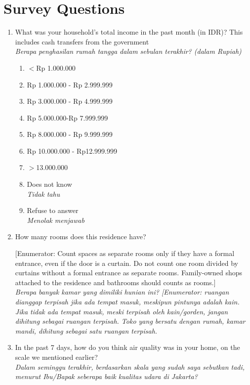 \documentclass[reqno,12pt,notitlepage]{article}
\begin{document}
\clearpage
\newpage
\section{Survey Questions}
\begin{enumerate}
\item What was your household's total income in the past month (in IDR)? This includes cash transfers from the government \\ \textit{ Berapa penghasilan rumah tangga dalam sebulan terakhir? (dalam Rupiah)}
\begin{enumerate}
    \item $<$Rp 1.000.000
    \item Rp 1.000.000 - Rp 2.999.999
    \item Rp 3.000.000 - Rp 4.999.999
    \item Rp 5.000.000-Rp 7.999.999
    \item Rp 8.000.000 - Rp 9.999.999
    \item Rp 10.000.000 - Rp12.999.999
    \item $>$13.000.000
        \item Does not know \\ \textit{Tidak tahu}
        \item Refuse to answer \\ \textit{Menolak menjawab}
\end{enumerate}
\item How many rooms does this residence have?

[Enumerator: Count spaces as separate rooms only if they have a formal entrance, even if the door is a curtain. Do not count one room divided by curtains without a formal entrance as separate rooms. Family-owned shops attached to the residence and bathrooms should counts as rooms.] \\ \textit{Berapa banyak kamar yang dimiliki hunian ini? 
[Enumerator: ruangan dianggap terpisah jika ada tempat masuk, meskipun pintunya adalah kain. Jika tidak ada tempat masuk, meski terpisah oleh kain/gorden, jangan dihitung sebagai ruangan terpisah. Toko yang bersatu dengan rumah, kamar mandi, dihitung sebagai satu ruangan terpisah.}

    \item In the past 7 days, how do you think air quality was in your home, on the scale we mentioned earlier? \\ \textit{Dalam seminggu terakhir, berdasarkan skala yang sudah saya sebutkan tadi, menurut Ibu/Bapak seberapa baik kualitas udara di Jakarta?}


\end{enumerate}
\end{document}
